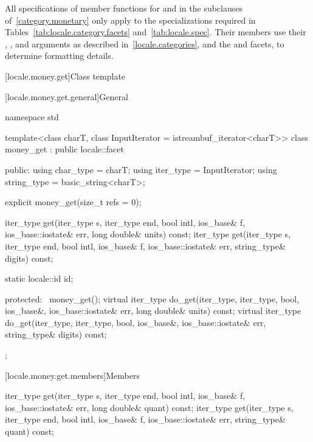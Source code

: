 \pnum
All specifications of member functions
for  and 
in the subclauses of~\ref{category.monetary} only apply to
the specializations required in Tables~\ref{tab:locale.category.facets}
and~\ref{tab:locale.spec}.
Their members use their , ,
and  arguments as described in~\ref{locale.categories}, and
the  and  facets,
to determine formatting details.

[locale.money.get]{Class template }

[locale.money.get.general]{General}

%
\begin{codeblock}
namespace std {
  template<class charT, class InputIterator = istreambuf_iterator<charT>>
    class money_get : public locale::facet {
    public:
      using char_type   = charT;
      using iter_type   = InputIterator;
      using string_type = basic_string<charT>;

      explicit money_get(size_t refs = 0);

      iter_type get(iter_type s, iter_type end, bool intl,
                    ios_base& f, ios_base::iostate& err,
                    long double& units) const;
      iter_type get(iter_type s, iter_type end, bool intl,
                    ios_base& f, ios_base::iostate& err,
                    string_type& digits) const;

      static locale::id id;

    protected:
      ~money_get();
      virtual iter_type do_get(iter_type, iter_type, bool, ios_base&,
                               ios_base::iostate& err, long double& units) const;
      virtual iter_type do_get(iter_type, iter_type, bool, ios_base&,
                               ios_base::iostate& err, string_type& digits) const;
    };
}
\end{codeblock}

[locale.money.get.members]{Members}

%
\begin{itemdecl}
iter_type get(iter_type s, iter_type end, bool intl, ios_base& f,
              ios_base::iostate& err, long double& quant) const;
iter_type get(iter_type s, iter_type end, bool intl, ios_base& f,
              ios_base::iostate& err, string_type& quant) const;
\end{itemdecl}

